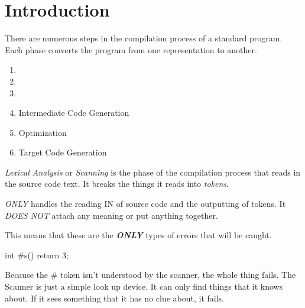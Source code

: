 \section{Introduction}\label{sec:Introduction}
There are numerous steps in the compilation process of a standard program.
Each phase converts the program from one representation to another.

\begin{enumerate}
\item {}
\item {}
\item {}
\item Intermediate Code Generation
\item Optimization
\item Target Code Generation
\end{enumerate}

\begin{definition}\label{def:Lexical Analysis}
  \emph{Lexical Analysis} or \emph{Scanning} is the phase of the compilation process that reads in the source code text.
  It breaks the things it reads into \emph{tokens}.
  \begin{remark}
     \emph{ONLY} handles the reading IN of source code and the outputting of tokens.
    It \emph{DOES NOT} attach any meaning or put anything together.
  \end{remark}

  This means that these are the \textbf{\emph{ONLY}} types of errors that will be caught.
  \begin{javasource}
    int #s() {
      return 3;
    }
  \end{javasource}

  Because the \# token isn't understood by the scanner, the whole thing fails.
  The Scanner is just a simple look up device. It can only find things that it knows about.
  If it sees something that it has no clue about, it fails.
\end{definition}

